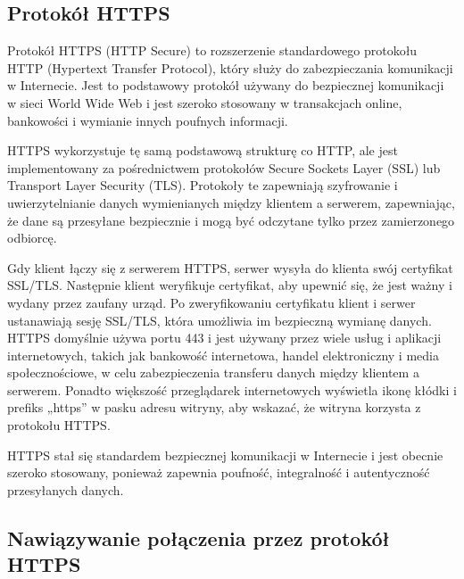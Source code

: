 \documentclass[12pt,twoside]{article}
\begin{document}
\subsection{Protokół HTTPS}

Protokół HTTPS (HTTP Secure) to rozszerzenie standardowego protokołu HTTP (Hypertext Transfer Protocol), który służy do zabezpieczania komunikacji w Internecie. Jest to podstawowy protokół używany do bezpiecznej komunikacji w sieci World Wide Web i jest szeroko stosowany w transakcjach online, bankowości i wymianie innych poufnych informacji.

HTTPS wykorzystuje tę samą podstawową strukturę co HTTP, ale jest implementowany za pośrednictwem protokołów Secure Sockets Layer (SSL) lub Transport Layer Security (TLS). Protokoły te zapewniają szyfrowanie i uwierzytelnianie danych wymienianych między klientem a serwerem, zapewniając, że dane są przesyłane bezpiecznie i mogą być odczytane tylko przez zamierzonego odbiorcę.

Gdy klient łączy się z serwerem HTTPS, serwer wysyła do klienta swój certyfikat SSL/TLS. Następnie klient weryfikuje certyfikat, aby upewnić się, że jest ważny i wydany przez zaufany urząd. Po zweryfikowaniu certyfikatu klient i serwer ustanawiają sesję SSL/TLS, która umożliwia im bezpieczną wymianę danych.
HTTPS domyślnie używa portu 443 i jest używany przez wiele usług i aplikacji internetowych, takich jak bankowość internetowa, handel elektroniczny i media społecznościowe, w celu zabezpieczenia transferu danych między klientem a serwerem. Ponadto większość przeglądarek internetowych wyświetla ikonę kłódki i prefiks „https” w pasku adresu witryny, aby wskazać, że witryna korzysta z protokołu HTTPS.

HTTPS stał się standardem bezpiecznej komunikacji w Internecie i jest obecnie szeroko stosowany, ponieważ zapewnia poufność, integralność i autentyczność przesyłanych danych.

\subsection{Nawiązywanie połączenia przez protokół HTTPS}
\end{document}
